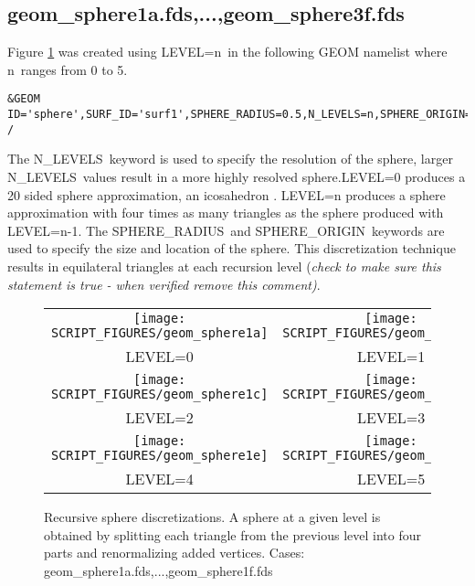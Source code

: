 \documentclass[12pt]{article}
\begin{document}
\subsection{geom\_sphere1a.fds,...,geom\_sphere3f.fds}
Figure \ref{fig:geom_sphere} was created using {\ct LEVEL=n}\
in the following GEOM namelist
where {\ct n}\ ranges from 0 to 5.

{\scriptsize
\begin{verbatim}
&GEOM ID='sphere',SURF_ID='surf1',SPHERE_RADIUS=0.5,N_LEVELS=n,SPHERE_ORIGIN=0.0,0.0,0.0 /
\end{verbatim}
}

The {\ct N\_LEVELS}\ keyword is used
to specify the resolution of the sphere, larger {\ct N\_LEVELS}\ values result
in a more highly resolved sphere.{\ct LEVEL=0} produces a 20 sided sphere approximation, an icosahedron .
{\ct LEVEL=n} produces a sphere approximation with four times as many triangles as the
sphere produced with {\ct LEVEL=n-1}.
The {\ct SPHERE\_RADIUS}\ and {\ct SPHERE\_ORIGIN}\ keywords are used to specify
the size and location of the sphere.  This discretization technique results in equilateral triangles at each recursion level {(\em check to make sure this statement is true - when verified remove this comment)}.

\begin{figure}
\begin{center}
\begin{tabular}{cc}
 \texttt{[image: SCRIPT\_FIGURES/geom\_sphere1a]}&
 \texttt{[image: SCRIPT\_FIGURES/geom\_sphere1b]}\\
 LEVEL=0&LEVEL=1\\
 \texttt{[image: SCRIPT\_FIGURES/geom\_sphere1c]}&
 \texttt{[image: SCRIPT\_FIGURES/geom\_sphere1d]}\\
 LEVEL=2&LEVEL=3\\
 \texttt{[image: SCRIPT\_FIGURES/geom\_sphere1e]}&
 \texttt{[image: SCRIPT\_FIGURES/geom\_sphere1f]}\\
 LEVEL=4&LEVEL=5\\
  \end{tabular}
\end{center}
 \caption{Recursive sphere discretizations.  A sphere at a given level is
 obtained by splitting each triangle from the previous level into four parts and renormalizing added vertices. Cases: geom\_sphere1a.fds,...,geom\_sphere1f.fds}
\label{fig:geom_sphere}
\end{figure}
\end{document}
